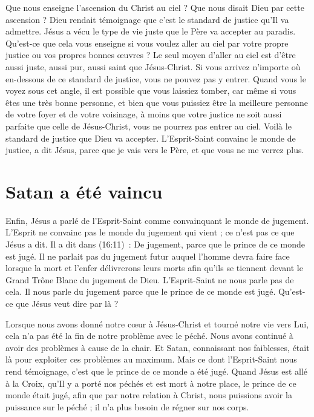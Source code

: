 Que nous enseigne l'ascension du Christ au ciel ?
 Que nous disait Dieu par cette ascension ?
 Dieu rendait témoignage que c'est le standard de justice qu'Il va admettre.
 Jésus a vécu le type de vie juste que le Père va accepter au paradis.
 Qu'est-ce que cela vous enseigne si vous voulez aller au ciel par votre propre
 justice ou vos propres bonnes œuvres ?
 Le seul moyen d'aller au ciel est d'être aussi juste, aussi pur,
 aussi saint que Jésus-Christ.
 Si vous arrivez n'importe où en-dessous de ce standard de justice,
 vous ne pouvez pas y entrer. Quand vous le voyez sous cet angle,
 il est possible que vous laissiez tomber, car même si vous êtes une très bonne
 personne, et bien que vous puissiez être la meilleure personne de votre foyer
 et de votre voisinage, à moins que votre justice ne soit aussi parfaite
 que celle de Jésus-Christ, vous ne pourrez pas entrer au ciel.
 Voilà le standard de justice que Dieu va accepter.
 L'Esprit-Saint convainc le monde de justice, a dit Jésus,
 \og parce que je vais vers le Père, et que vous ne me verrez plus. \fg{}


\section*{Satan a été vaincu}

Enfin, Jésus a parlé de l'Esprit-Saint comme convainquant le monde de jugement.
 L'Esprit ne convainc pas le monde du jugement qui vient ;
 ce n'est pas ce que Jésus a dit. Il a dit dans (16:11)~:
 \og De jugement, parce que le prince de ce monde est jugé. \fg{}
 Il ne parlait pas du jugement futur auquel l'homme devra faire face
 lorsque la mort et l'enfer délivrerons leurs morts afin qu'ils se tiennent
 devant le Grand Trône Blanc du jugement de Dieu.
 L'Esprit-Saint ne nous parle pas de cela. Il nous parle du jugement
 \og parce que le prince de ce monde est jugé. \fg{}
 Qu'est-ce que Jésus veut dire par là ?

Lorsque nous avons donné notre cœur à Jésus-Christ et tourné notre vie
 vers Lui, cela n'a pas été la fin de notre problème avec le péché.
 Nous avons continué à avoir des problèmes à cause de la chair.
 Et Satan, connaissant nos faiblesses, était là pour exploiter ces problèmes
 au maximum. Mais ce dont l'Esprit-Saint nous rend témoignage,
 c'est que le prince de ce monde a été jugé.
 Quand Jésus est allé à la Croix, qu'Il y a porté nos péchés et est mort
 à notre place, le prince de ce monde était jugé,
 afin que par notre relation à Christ, nous puissions avoir la puissance
 sur le péché ; il n'a plus besoin de régner sur nos corps.

